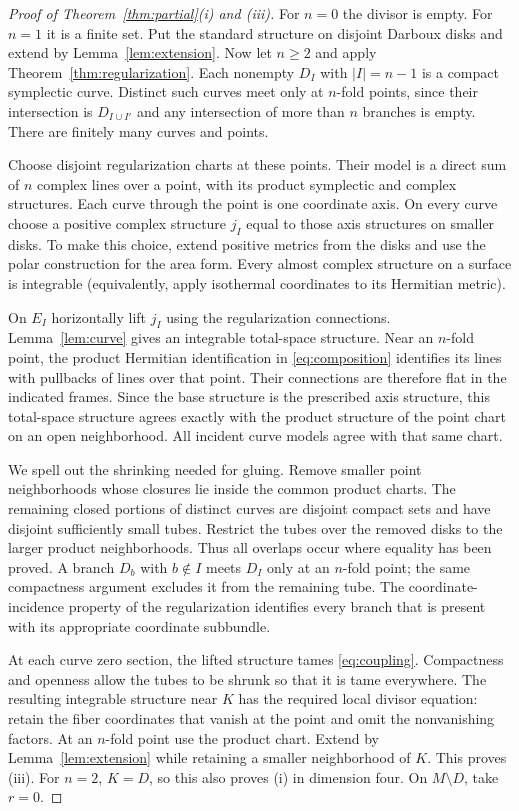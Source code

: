 \documentclass[11pt]{article}
\theoremstyle{definition}
\theoremstyle{remark}
\begin{document}
\begin{proof}[Proof of Theorem~\ref{thm:partial}(i) and (iii)]
For $n=0$ the divisor is empty. For $n=1$ it is a finite set. Put the standard structure on disjoint Darboux disks and extend by Lemma~\ref{lem:extension}.
Now let $n\geq2$ and apply Theorem~\ref{thm:regularization}. Each nonempty $D_I$ with $|I|=n-1$ is a compact symplectic curve. Distinct such curves meet only at $n$-fold points, since their intersection is $D_{I\cup I'}$ and any intersection of more than $n$ branches is empty. There are finitely many curves and points.

Choose disjoint regularization charts at these points. Their model is a direct sum of $n$ complex lines over a point, with its product symplectic and complex structures. Each curve through the point is one coordinate axis. On every curve choose a positive complex structure $j_I$ equal to those axis structures on smaller disks. To make this choice, extend positive metrics from the disks and use the polar construction for the area form. Every almost complex structure on a surface is integrable (equivalently, apply isothermal coordinates to its Hermitian metric).

On $E_I$ horizontally lift $j_I$ using the regularization connections. Lemma~\ref{lem:curve} gives an integrable total-space structure. Near an $n$-fold point, the product Hermitian identification in \eqref{eq:composition} identifies its lines with pullbacks of lines over that point. Their connections are therefore flat in the indicated frames. Since the base structure is the prescribed axis structure, this total-space structure agrees exactly with the product structure of the point chart on an open neighborhood. All incident curve models agree with that same chart.

We spell out the shrinking needed for gluing. Remove smaller point neighborhoods whose closures lie inside the common product charts. The remaining closed portions of distinct curves are disjoint compact sets and have disjoint sufficiently small tubes. Restrict the tubes over the removed disks to the larger product neighborhoods. Thus all overlaps occur where equality has been proved. A branch $D_b$ with $b\notin I$ meets $D_I$ only at an $n$-fold point; the same compactness argument excludes it from the remaining tube. The coordinate-incidence property of the regularization identifies every branch that is present with its appropriate coordinate subbundle.

At each curve zero section, the lifted structure tames \eqref{eq:coupling}. Compactness and openness allow the tubes to be shrunk so that it is tame everywhere. The resulting integrable structure near $K$ has the required local divisor equation: retain the fiber coordinates that vanish at the point and omit the nonvanishing factors. At an $n$-fold point use the product chart. Extend by Lemma~\ref{lem:extension} while retaining a smaller neighborhood of $K$. This proves (iii). For $n=2$, $K=D$, so this also proves (i) in dimension four. On $M\setminus D$, take $r=0$.
\end{proof}
\end{document}
